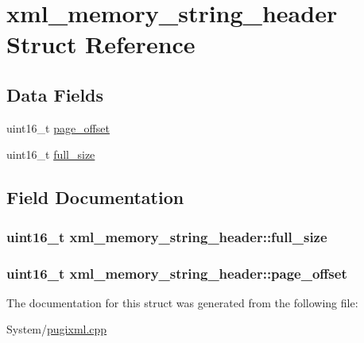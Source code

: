 \hypertarget{structxml__memory__string__header}{\section{xml\-\_\-memory\-\_\-string\-\_\-header Struct Reference}
\label{structxml__memory__string__header}
}
\subsection*{Data Fields}
\begin{DoxyCompactItemize}
\item 
uint16\-\_\-t \hyperlink{structxml__memory__string__header_a0cc274672f1263f73eeb6bf839bf96ee}{page\-\_\-offset}
\item 
uint16\-\_\-t \hyperlink{structxml__memory__string__header_abbb48a709081e6610dffad322499e3f7}{full\-\_\-size}
\end{DoxyCompactItemize}


\subsection{Field Documentation}
\hypertarget{structxml__memory__string__header_abbb48a709081e6610dffad322499e3f7}{
\subsubsection[{full\-\_\-size}]{\setlength{\rightskip}{0pt plus 5cm}uint16\-\_\-t xml\-\_\-memory\-\_\-string\-\_\-header\-::full\-\_\-size}}\label{structxml__memory__string__header_abbb48a709081e6610dffad322499e3f7}
\hypertarget{structxml__memory__string__header_a0cc274672f1263f73eeb6bf839bf96ee}{
\subsubsection[{page\-\_\-offset}]{\setlength{\rightskip}{0pt plus 5cm}uint16\-\_\-t xml\-\_\-memory\-\_\-string\-\_\-header\-::page\-\_\-offset}}\label{structxml__memory__string__header_a0cc274672f1263f73eeb6bf839bf96ee}


The documentation for this struct was generated from the following file\-:\begin{DoxyCompactItemize}
\item 
System/\hyperlink{pugixml_8cpp}{pugixml.\-cpp}\end{DoxyCompactItemize}
